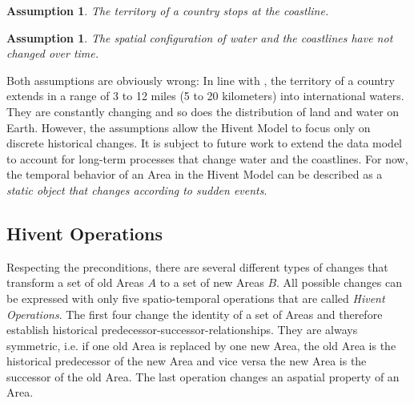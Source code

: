 \vspace{-1.0em}
\newtheorem{coastline_territory}[assicounter]{Assumption}
\begin{coastline_territory}
\label{axm:coastline_territory}
  The territory of a country stops at the coastline.
\end{coastline_territory}

\vspace{-2.0em}
\newtheorem{constant_coastlines}[assicounter]{Assumption}
\begin{constant_coastlines}
\label{axm:constant_coastlines}
  The spatial configuration of water and the coastlines have not changed over time.
\end{constant_coastlines}

Both assumptions are obviously wrong: In line with \cite{UNSeaBorders}, the territory of a country extends in a range of 3 to 12 miles (5 to 20 kilometers) into international waters. They are constantly changing and so does the distribution of land and water on Earth. However, the assumptions allow the Hivent Model to focus only on discrete historical changes. It is subject to future work to extend the data model to account for long-term processes that change water and the coastlines. For now, the temporal behavior of an Area in the Hivent Model can be described as a \emph{static object that changes according to sudden events}.



\subsection{Hivent Operations} %
\label{sub:hivent_operations}

Respecting the preconditions, there are several different types of changes that transform a set of old Areas $A$ to a set of new Areas $B$. All possible changes can be expressed with only five spatio-temporal operations that are called \emph{Hivent Operations}. The first four change the identity of a set of Areas and therefore establish historical predecessor-successor-relationships. They are always symmetric, i.e. if one old Area is replaced by one new Area, the old Area is the historical predecessor of the new Area and vice versa the new Area is the successor of the old Area. The last operation changes an aspatial property of an Area.

